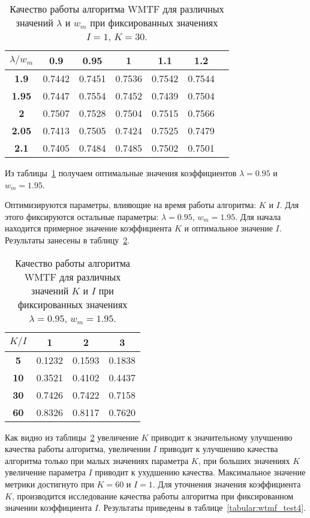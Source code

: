     \begin{table}[ht!]
        \caption{Качество работы алгоритма WMTF для различных значений $\lambda$ и $w_m$ при фиксированных значениях $I=1$, $K=30$. \bigskip}
        \centering

        \label{tabular:wtmf_test2}
        \begin{tabular}{|c|c|c|c|c|c|c|} \hline
            $\lambda/w_m$ & \bf{0.9} & \bf{0.95} & \bf{1} & \bf{1.1} & \bf{1.2} \\ \hline
            \bf{1.9} & 0.7442 & 0.7451 & 0.7536 & 0.7542 & 0.7544 \\ \hline
            \bf{1.95} & 0.7447 & 0.7554 & 0.7452 & 0.7439 & 0.7504 \\ \hline
            \bf{2} & 0.7507 & 0.7528 & 0.7504 & 0.7515 & 0.7566 \\ \hline
            \bf{2.05} & 0.7413 & 0.7505 & 0.7424 & 0.7525 & 0.7479 \\ \hline
            \bf{2.1} & 0.7405 & 0.7484 & 0.7485 & 0.7502 & 0.7501 \\ \hline
        \end{tabular}
    \end{table}
    Из таблицы~\ref{tabular:wtmf_test2} получаем оптимальные значения коэффициентов $\lambda=0.95$ и $w_m=1.95$.

    Оптимизируются параметры, влияющие на время работы алгоритма: $K$ и $I$.
    Для этого фиксируются остальные параметры: $\lambda=0.95$, $w_m=1.95$.
    Для начала находится примерное значение коэффициента $K$ и оптимальное значение $I$.
    Результаты занесены в таблицу~\ref{tabular:wtmf_test3}.

    \begin{table}[ht!]
        \caption{Качество работы алгоритма WMTF для различных значений $K$ и $I$ при фиксированных значениях $\lambda=0.95$, $w_m=1.95$. \bigskip}
        \centering

        \label{tabular:wtmf_test3}
        \begin{tabular}{|c|c|c|c|} \hline
            $K/I$ & \bf{1} & \bf{2} & \bf{3} \\ \hline
            \bf{5} & 0.1232 & 0.1593 & 0.1838 \\ \hline
            \bf{10} & 0.3521 & 0.4102 & 0.4437 \\ \hline
            \bf{30} & 0.7426 & 0.7422 & 0.7158 \\ \hline
            \bf{60} & 0.8326 & 0.8117 & 0.7620 \\ \hline
        \end{tabular}
    \end{table}
    Как видно из таблицы~\ref{tabular:wtmf_test3} увеличение $K$ приводит к значительному улучшению качества работы алгоритма,
    увеличении $I$ приводит к улучшению качества алгоритма только при малых значениях параметра $K$, при больших значениях $K$ увеличение параметра $I$ приводит к ухудшению качества.
    Максимальное значение метрики достигнуто при $K=60$ и $I=1$.
    Для уточнения значения коэффициента $K$, производится исследование качества работы алгоритма при фиксированном значении коэффициента $I$.
    Результаты приведены в таблице~\ref{tabular:wtmf_test4}.


